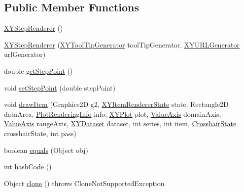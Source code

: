 \subsection*{Public Member Functions}
\begin{DoxyCompactItemize}
\item 
\mbox{\hyperlink{classorg_1_1jfree_1_1chart_1_1renderer_1_1xy_1_1_x_y_step_renderer_a2175b302b0c29665a5dedf8828ffc3fb}{X\+Y\+Step\+Renderer}} ()
\item 
\mbox{\hyperlink{classorg_1_1jfree_1_1chart_1_1renderer_1_1xy_1_1_x_y_step_renderer_a7df82f84c1572a1e5f4876f30d5b4623}{X\+Y\+Step\+Renderer}} (\mbox{\hyperlink{interfaceorg_1_1jfree_1_1chart_1_1labels_1_1_x_y_tool_tip_generator}{X\+Y\+Tool\+Tip\+Generator}} tool\+Tip\+Generator, \mbox{\hyperlink{interfaceorg_1_1jfree_1_1chart_1_1urls_1_1_x_y_u_r_l_generator}{X\+Y\+U\+R\+L\+Generator}} url\+Generator)
\item 
double \mbox{\hyperlink{classorg_1_1jfree_1_1chart_1_1renderer_1_1xy_1_1_x_y_step_renderer_a4e528d2e25bd9b196bc6613432792fe7}{get\+Step\+Point}} ()
\item 
void \mbox{\hyperlink{classorg_1_1jfree_1_1chart_1_1renderer_1_1xy_1_1_x_y_step_renderer_a657a476c2702d644c93e754f73e5732a}{set\+Step\+Point}} (double step\+Point)
\item 
void \mbox{\hyperlink{classorg_1_1jfree_1_1chart_1_1renderer_1_1xy_1_1_x_y_step_renderer_a92f696807629d779f2579cd54e98019d}{draw\+Item}} (Graphics2D g2, \mbox{\hyperlink{classorg_1_1jfree_1_1chart_1_1renderer_1_1xy_1_1_x_y_item_renderer_state}{X\+Y\+Item\+Renderer\+State}} state, Rectangle2D data\+Area, \mbox{\hyperlink{classorg_1_1jfree_1_1chart_1_1plot_1_1_plot_rendering_info}{Plot\+Rendering\+Info}} info, \mbox{\hyperlink{classorg_1_1jfree_1_1chart_1_1plot_1_1_x_y_plot}{X\+Y\+Plot}} plot, \mbox{\hyperlink{classorg_1_1jfree_1_1chart_1_1axis_1_1_value_axis}{Value\+Axis}} domain\+Axis, \mbox{\hyperlink{classorg_1_1jfree_1_1chart_1_1axis_1_1_value_axis}{Value\+Axis}} range\+Axis, \mbox{\hyperlink{interfaceorg_1_1jfree_1_1data_1_1xy_1_1_x_y_dataset}{X\+Y\+Dataset}} dataset, int series, int item, \mbox{\hyperlink{classorg_1_1jfree_1_1chart_1_1plot_1_1_crosshair_state}{Crosshair\+State}} crosshair\+State, int pass)
\item 
boolean \mbox{\hyperlink{classorg_1_1jfree_1_1chart_1_1renderer_1_1xy_1_1_x_y_step_renderer_a6269f1fef440c403b8dd924dc1f77b81}{equals}} (Object obj)
\item 
int \mbox{\hyperlink{classorg_1_1jfree_1_1chart_1_1renderer_1_1xy_1_1_x_y_step_renderer_a5a1ec9cd08cbf2f6ba478feaec34e63f}{hash\+Code}} ()
\item 
Object \mbox{\hyperlink{classorg_1_1jfree_1_1chart_1_1renderer_1_1xy_1_1_x_y_step_renderer_a88599a40cf1e5a836e84c4f9f15ef393}{clone}} ()  throws Clone\+Not\+Supported\+Exception 
\end{DoxyCompactItemize}
